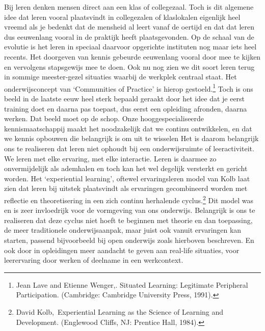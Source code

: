 \documentclass{jote-book}
\begin{document}
	Bij leren denken mensen direct aan een klas of collegezaal. Toch is dit algemene idee dat leren vooral plaatsvindt in collegezalen of klaslokalen eigenlijk heel vreemd als je bedenkt dat de mensheid al leert vanaf de oertijd en dat dat leren dus eeuwenlang vooral in de praktijk heeft plaatsgevonden. Op de schaal van de evolutie is het leren in speciaal daarvoor opgerichte instituten nog maar iets heel recents. Het doorgeven van kennis gebeurde eeuwenlang vooral door mee te kijken en vervolgens stapsgewijs mee te doen. Ook nu nog zien we dit soort leren terug in sommige meester-gezel situaties waarbij de werkplek centraal staat. Het onderwijsconcept van ‘Communities of Practice' is hierop gestoeld.\footnote{Jean Lave and Etienne Wenger,. Situated Learning: Legitimate Peripheral Participation. (Cambridge: Cambridge University Press, 1991). } Toch is ons beeld in de laatste eeuw heel sterk bepaald geraakt door het idee dat je eerst training doet en daarna pas toepast, dus eerst een opleiding afronden, daarna werken. Dat beeld moet op de schop. Onze hooggespecialiseerde kennismaatschappij maakt het noodzakelijk dat we continu ontwikkelen, en dat we kennis opbouwen die belangrijk is om uit te wisselen Het is daarom belangrijk ons te realiseren dat leren niet ophoudt bij een onderwijsruimte of leeractiviteit. We leren met elke ervaring, met elke interactie. Leren is daarmee zo onvermijdelijk als ademhalen en toch kan het wel degelijk versterkt en gericht worden. Het ‘experiential learning', oftewel ervaringsleren model van Kolb laat zien dat leren bij uitstek plaatsvindt als ervaringen gecombineerd worden met reflectie en theoretisering in een zich continu herhalende cyclus.\footnote{David Kolb, Experiential Learning as the Science of Learning and Development. (Englewood Cliffs, NJ: Prentice Hall, 1984).} Dit model was en is zeer invloedrijk voor de vormgeving van ons onderwijs. Belangrijk is ons te realiseren dat deze cyclus niet hoeft te beginnen met theorie en dan toepassing, de meer traditionele onderwijsaanpak, maar juist ook vanuit ervaringen kan starten, passend bijvoorbeeld bij open onderwijs zoals hierboven beschreven. En ook door in opleidingen meer aandacht te geven aan real-life situaties, voor leerervaring door werken of deelname in een werkcontext.
\end{document}
